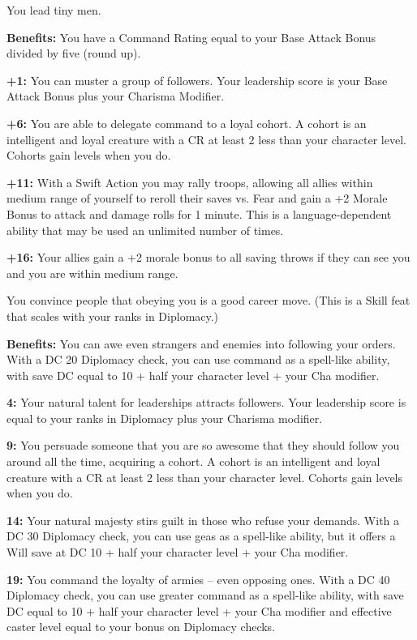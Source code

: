 
You lead tiny men.

\textbf{Benefits:} You have a Command Rating equal to your Base Attack Bonus divided by five (round up).

\textbf{+1:} You can muster a group of followers. Your leadership score is your Base Attack Bonus plus your Charisma Modifier.

\textbf{+6:} You are able to delegate command to a loyal cohort. A cohort is an intelligent and loyal creature with a CR at least 2 less than your character level. Cohorts gain levels when you do.

\textbf{+11:} With a Swift Action you may rally troops, allowing all allies within medium range of yourself to reroll their saves vs. Fear and gain a +2 Morale Bonus to attack and damage rolls for 1 minute. This is a language-dependent ability that may be used an unlimited number of times.

\textbf{+16:} Your allies gain a +2 morale bonus to all saving throws if they can see you and you are within medium range.


You convince people that obeying you is a good career move. (This is a Skill feat that scales with your ranks in Diplomacy.)

\textbf{Benefits:} You can awe even strangers and enemies into following your orders. With a DC 20 Diplomacy check, you can use command as a spell-like ability, with save DC equal to 10 + half your character level + your Cha modifier.

\textbf{4:} Your natural talent for leaderships attracts followers. Your leadership score is equal to your ranks in Diplomacy plus your Charisma modifier.

\textbf{9:} You persuade someone that you are so awesome that they should follow you around all the time, acquiring a cohort. A cohort is an intelligent and loyal creature with a CR at least 2 less than your character level. Cohorts gain levels when you do.

\textbf{14:} Your natural majesty stirs guilt in those who refuse your demands. With a DC 30 Diplomacy check, you can use geas as a spell-like ability, but it offers a Will save at DC 10 + half your character level + your Cha modifier.

\textbf{19:} You command the loyalty of armies -- even opposing ones. With a DC 40 Diplomacy check, you can use greater command as a spell-like ability, with save DC equal to 10 + half your character level + your Cha modifier and effective caster level equal to your bonus on Diplomacy checks.

